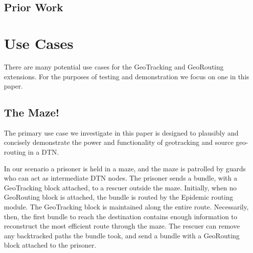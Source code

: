 \documentclass{sig-alternate}
\begin{document}
\CopyrightYear
\crdata








\subsection {Prior Work}


%
%
\section{Use Cases}

There are many potential use cases for the GeoTracking and GeoRouting extensions.  For the purposes of testing and demonstration we focus on one in this paper.

\subsection{The Maze!}

The primary use case we investigate in this paper is designed to plausibly and concisely demonstrate the power and functionality of geotracking and source geo-routing in a DTN.

In our scenario a prisoner is held in a maze, and the maze is patrolled by guards who can act as intermediate DTN nodes.  The prisoner sends a bundle, with a GeoTracking block attached, to a rescuer outside the maze.  Initially, when no GeoRouting block is attached, the bundle is routed by the Epidemic routing module.  The GeoTracking block is maintained along the entire route.  Necessarily, then, the first bundle to reach the destination contains enough information to reconstruct the most efficient route through the maze.  The rescuer can remove any backtracked paths the bundle took, and send a bundle with a GeoRouting block attached to the prisoner.
\end{document}
